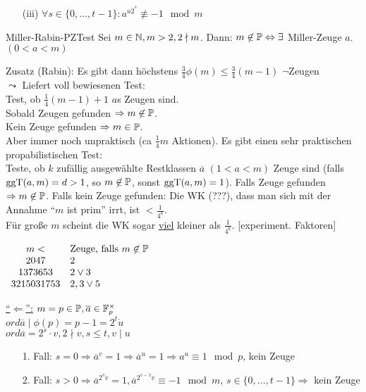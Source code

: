\documentclass[a4paper,twoside,DIV15,BCOR12mm]{scrbook}
\begin{document}
\begin{itemize}
\begin{definition}
\begin{itemize}
    \item[(iii)] $\forall s \in \{0,...,t-1\}: a^{u\dot 2^s} \not\equiv -1 \mod m$
   \end{itemize}
  \end{definition}
  \begin{satz}{Miller-Rabin-PZTest}
   Sei $m \in \mathbb{N}, m > 2, 2 \nmid m$. Dann: $m \not\in \mathbb{P} \Leftrightarrow \exists$ Miller-Zeuge $a$. $(0 < a < m)$
  \end{satz}
  Zusatz (Rabin): Es gibt dann höchstens $\frac{3}{4}\phi(m) \le \frac{3}{4}(m-1)$ $\neg$Zeugen\\
  $\leadsto$ Liefert voll bewiesenen Test:\\
  Test, ob $\frac{1}{4}(m-1)+1$ $a$s Zeugen sind.\\
  Sobald Zeugen gefunden $\Rightarrow m \not\in \mathbb{P}$.\\
  Kein Zeuge gefunden $\Rightarrow m \in \mathbb{P}$.\\
  Aber immer noch unpraktisch (ca $\frac{1}{4}m$ Aktionen). Es gibt einen sehr praktischen propabilistischen Test:\\
  Teste, ob $k$ zufällig ausgewählte Restklassen $\overline a$ $(1 < a < m)$ Zeuge sind (falls $\mathop{\rm ggT}\nolimits (a,m) = d > 1$, so $m \not\in \mathbb{P}$, sonst $\mathop{\rm ggT}\nolimits (a,m) = 1$). Falls Zeuge gefunden $\Rightarrow m \not\in \mathbb{P}$. Falls kein Zeuge gefunden: Die WK (???), dass man sich mit der Annahme "`$m$ ist prim"' irrt, ist $< \frac{1}{4^k}$.\\
  Für große $m$ scheint die WK sogar \underline{viel} kleiner als $\frac{1}{4^k}$. [experiment. Faktoren]
  
  $\begin{array}{cl}
   m < & \text{Zeuge, falls } m \not\in \mathbb{P} \\
   2047 & 2 \\
   1373653 & 2 \vee 3 \\
   3215031753 & 2,3 \vee 5
  \end{array}$
  \begin{beweis}
   \item[\underline{"`$\Leftarrow$"':}] $m = p \in \mathbb{P}, \overline a \in \mathbb{F}_p^\times$\\
    $ord \overline a \mid \phi(p) = p-1 = 2^t \dot u$\\
    $ord \overline a = 2^s \cdot v, 2 \nmid v, s \le t, v \mid u$
    \begin{itemize}
     \item[1. Fall:] $s = 0 \Rightarrow \overline a^v = 1 \Rightarrow \overline a^u = 1 \Rightarrow a^u \equiv 1 \mod p$, kein Zeuge
     \item[2. Fall:] $s > 0 \Rightarrow \overline a^{2^s \dot v} = 1, \overline a^{2^{s-1}\dot v} \equiv -1 \mod m$, $s \in \{0,...,t-1\} \Rightarrow$ kein Zeuge
    \end{itemize}
  \end{beweis}
\end{itemize}
\end{document}
